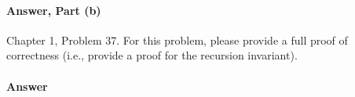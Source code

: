 \documentclass{article}
\begin{document}
\paragraph{Answer, Part (b)}

\todo{}

\collab{\todo{}}

Chapter 1, Problem 37.  For this problem, please provide a full proof of
correctness (i.e., provide a proof for the recursion invariant).

\paragraph{Answer}
\todo{}
\end{document}
